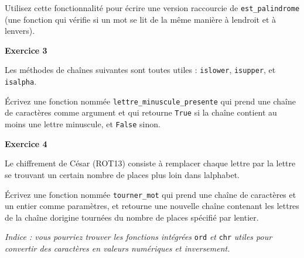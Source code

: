 Utilisez cette fonctionnalité pour écrire une version raccourcie de
\texttt{est\_palindrome} (une fonction qui vérifie si un mot se lit de
la même manière à l\textquotesingle endroit et à
l\textquotesingle envers).

\textbf{Exercice 3}

Les méthodes de chaînes suivantes sont toutes utiles : \texttt{islower},
\texttt{isupper}, et \texttt{isalpha}.

Écrivez une fonction nommée \texttt{lettre\_minuscule\_presente} qui
prend une chaîne de caractères comme argument et qui retourne
\texttt{True} si la chaîne contient au moins une lettre minuscule, et
\texttt{False} sinon.

\textbf{Exercice 4}

Le chiffrement de César (ROT13) consiste à remplacer chaque lettre par
la lettre se trouvant un certain nombre de places plus loin dans
l\textquotesingle alphabet.

Écrivez une fonction nommée \texttt{tourner\_mot} qui prend une chaîne
de caractères et un entier comme paramètres, et retourne une nouvelle
chaîne contenant les lettres de la chaîne d\textquotesingle origine
tournées du nombre de places spécifié par l\textquotesingle entier.

\emph{Indice : vous pourriez trouver les fonctions intégrées}
\texttt{ord} \emph{et} \texttt{chr} \emph{utiles pour convertir des
caractères en valeurs numériques et inversement.}
